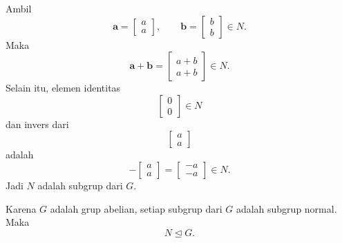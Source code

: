 \documentclass[10pt,a4paper]{article}
\begin{document}
\begin{enumerate}
        Ambil
        \[
          \mathbf{a}=
          \begin{bmatrix}
            a\\a
          \end{bmatrix},
          \qquad
          \mathbf{b}=
          \begin{bmatrix}
            b\\b
          \end{bmatrix}
          \in N.
        \]
        Maka
        \[
          \mathbf{a}+\mathbf{b}
          =
          \begin{bmatrix}
            a+b\\a+b
          \end{bmatrix}
          \in N.
        \]
        Selain itu, elemen identitas
        \[
          \begin{bmatrix}
            0\\0
          \end{bmatrix}
          \in N
        \]
        dan invers dari
        \[
          \begin{bmatrix}
            a\\a
          \end{bmatrix}
        \]
        adalah
        \[
          -
          \begin{bmatrix}
            a\\a
          \end{bmatrix}
          =
          \begin{bmatrix}
            -a\\-a
          \end{bmatrix}
          \in N.
        \]
        Jadi $N$ adalah subgrup dari $G$.

        Karena $G$ adalah grup abelian, setiap subgrup dari $G$ adalah subgrup normal. Maka
        \[
          \boxed{N\trianglelefteq G.}
        \]


\end{enumerate}
\end{document}
